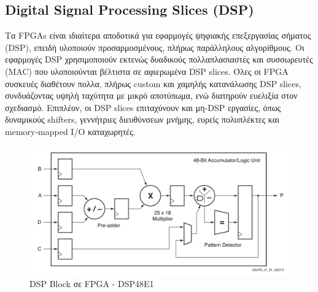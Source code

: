 \subsection{Digital Signal Processing Slices (DSP)}

Τα FPGAs είναι ιδιαίτερα αποδοτικά για εφαρμογές ψηφιακής επεξεργασίας σήματος (DSP), 
επειδή υλοποιούν προσαρμοσμένους, πλήρως παράλληλους αλγορίθμους. 
Οι εφαρμογές DSP χρησιμοποιούν εκτενώς δυαδικούς πολλαπλασιαστές και συσσωρευτές (MAC)
που υλοποιούνται βέλτιστα σε αφιερωμένα DSP slices.
Όλες οι FPGA συσκευές διαθέτουν πολλα, πλήρως custom και χαμηλής κατανάλωσης DSP slices,
συνδυάζοντας υψηλή ταχύτητα με μικρό αποτύπωμα, ενώ διατηρούν ευελιξία στον σχεδιασμό.
Επιπλέον, οι DSP slices επιταχύνουν και μη‑DSP εργασίες, όπως δυναμικούς shifters,
γεννήτριες διευθύνσεων μνήμης, ευρείς πολυπλέκτες και memory‑mapped I/O καταχωρητές.

\begin{figure}[h!]
  \centering
  \includegraphics[width=1.0\textwidth]{figures/chapter3/dsp_block.png}
  \caption{DSP Block σε FPGA - DSP48E1}
  \label{fig:dsp_block}
\end{figure}



